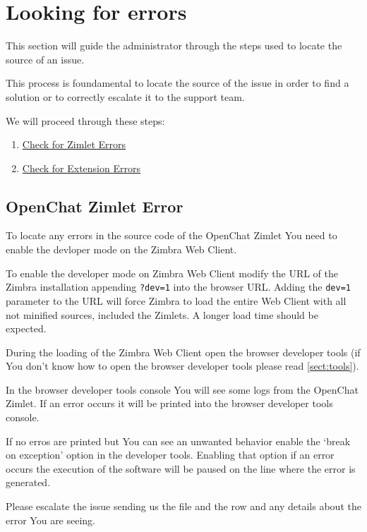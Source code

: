 \section{Looking for errors}

This section will guide the administrator through the steps used to locate the source of an issue.

This process is foundamental to locate the source of the issue in order to find a solution or to correctly escalate it
to the support team.

We will proceed through these steps:
\begin{enumerate}
    \item \hyperref[{sect:zim_err}]{Check for Zimlet Errors}
    \item \hyperref[{sect:ext_err}]{Check for Extension Errors}
\end{enumerate}

\subsection[Zimlet Error]{OpenChat Zimlet Error}
\label{sect:zim_err}
To locate any errors in the source code of the OpenChat Zimlet You need to enable the devloper mode on the Zimbra Web Client.

To enable the developer mode on Zimbra Web Client modify the URL of the Zimbra installation appending \verb+?dev=1+ into
the browser URL. Adding the \verb+dev=1+ parameter to the URL will force Zimbra to load the entire Web Client with all not
minified sources, included the Zimlets. A longer load time should be expected.

During the loading of the Zimbra Web Client open the browser developer tools (if You don't know how to open the browser
developer tools please read \autoref{sect:tools}).

In the browser developer tools console You will see some logs from the OpenChat Zimlet. If an error occurs it will be printed into
the browser developer tools console.

If no erros are printed but You can see an unwanted behavior enable the `break on exception' option in the developer tools.
Enabling that option if an error occurs the execution of the software will be paused on the line where the error is generated.

Please escalate the issue sending us the file and the row and any details about the error You are seeing\footnotemark[1].

